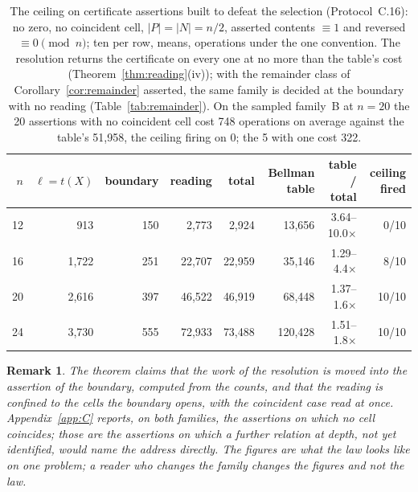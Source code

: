 \documentclass[pdflatex,sn-mathphys-num]{sn-jnl}
\theoremstyle{thmstyleone}%
\theoremstyle{thmstyletwo}%
\newtheorem{remark}{Remark}[section]
\theoremstyle{thmstylethree}%
\newtheorem{remark}{Remark}[section]
\newcommand{\ceilCo}{5}
\newcommand{\ceilNc}{20}
\newcommand{\ceilCoStruct}{322}
\newcommand{\ceilNcStruct}{748}
\newcommand{\ceilNcTable}{51,958}
\newcommand{\ceilNcFired}{0}
\begin{document}
\begin{table}[!htbp]
\centering\small
\caption{The ceiling on certificate assertions built to defeat the selection (Protocol~C.16): no zero, no coincident cell, $|P|=|N|=n/2$, asserted contents $\equiv1$ and reversed $\equiv0 \pmod n$; ten per row, means, operations under the one convention. The resolution returns the certificate on every one at no more than the table's cost (Theorem~\ref{thm:reading}(iv)); with the remainder class of Corollary~\ref{cor:remainder} asserted, the same family is decided at the boundary with no reading (Table~\ref{tab:remainder}). On the sampled family~B at $n=20$ the \ceilNc{} assertions with no coincident cell cost \ceilNcStruct{} operations on average against the table's \ceilNcTable{}, the ceiling firing on \ceilNcFired{}; the \ceilCo{} with one cost \ceilCoStruct{}.}
\label{tab:ceiling}
\setlength{\tabcolsep}{4pt}
\begin{tabular}{rrrrrrrr}
\toprule
$n$ & $\ell=t(X)$ & boundary & reading & total & Bellman table & table / total & ceiling fired \\
\midrule
12 & 913 & 150 & 2,773 & 2,924 & 13,656 & 3.64--10.0$\times$ & 0/10 \\
16 & 1,722 & 251 & 22,707 & 22,959 & 35,146 & 1.29--4.4$\times$ & 8/10 \\
20 & 2,616 & 397 & 46,522 & 46,919 & 68,448 & 1.37--1.6$\times$ & 10/10 \\
24 & 3,730 & 555 & 72,933 & 73,488 & 120,428 & 1.51--1.8$\times$ & 10/10 \\
\bottomrule
\end{tabular}
\end{table}

\begin{remark}
The theorem claims that the work of the resolution is moved into the assertion of the boundary, computed from the counts, and that the reading is confined to the cells the boundary opens, with the coincident case read at once. Appendix~\ref{app:C} reports, on both families, the assertions on which no cell coincides; those are the assertions on which a further relation at depth, not yet identified, would name the address directly. The figures are what the law looks like on one problem; a reader who changes the family changes the figures and not the law.
\end{remark}
\end{document}
